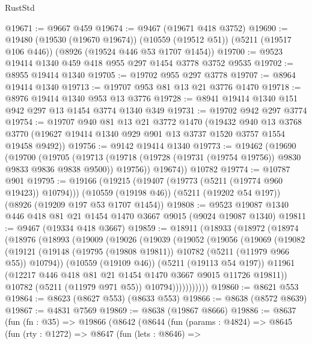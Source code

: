 \begin{lexlean}{RustStd}
\begin{coremodule}
@19671 := @9667 @459
@19674 := @9467 (@19671 @418 @3752)
@19690 := @19480
    (@19530 (@19670 @19674))
    (@10559 (@19512 @51))
    (@5211 (@19517 @106 @446))
    (@8926 (@19524 @446 @53 @1707 @1454))
@19700 := @9523 @19414 @1340 @459 @418 @955 @297 @1454 @3778 @3752 @9535
@19702 := @8955 @19414 @1340
@19705 := @19702 @955 @297 @3778
@19707 := @8964 @19414 @1340
@19713 := @19707 @953 @81 @13 @21 @3776 @1470
@19718 := @8976 @19414 @1340 @953 @13 @3776
@19728 := @8941 @19414 @1340 @151 @942 @297 @13 @1454 @3774 @1340 @349
@19731 := @19702 @942 @297 @3774
@19754 := @19707
    @940
    @81
    @13
    @21
    @3772
    @1470
    (@19432
      @940
      @13
      @3768
      @3770
      (@19627 @19414 @1340 @929 @901 @13 @3737 @1520 @3757 @1554 @19458 @9492))
@19756 := @9142 @19414 @1340
@19773 := @19462
    (@19690
      (@19700
        (@19705
          (@19713 (@19718 (@19728 (@19731 (@19754 @19756)) @9830 @9833 @9836 @9838 @9500)) @19756))
        @19674))
    @10782
@19774 := @10787 @901
@19795 := @19166
    (@19215 (@19407 (@19773 (@5211 (@19774 @960 @19423)) @10794)))
    (@10559 (@19198 @46))
    (@5211 (@19202 @54 @197))
    (@8926 (@19209 @197 @53 @1707 @1454))
@19808 := @9523 @19087 @1340 @446 @418 @81 @21 @1454 @1470 @3667 @9015 (@9024 @19087 @1340)
@19811 := @9467 (@19334 @418 @3667)
@19859 := @18911
    (@18933
      (@18972
        (@18974
          (@18976
            (@18993
              (@19009
                (@19026
                  (@19039
                    (@19052
                      (@19056
                        (@19069
                          (@19082
                            (@19121
                              (@19148
                                (@19795 (@19808 @19811))
                                @10782
                                (@5211 (@11979 @966 @55))
                                @10794))
                            (@10559 (@19109 @46))
                            (@5211 (@19113 @54 @197))
                            @11961
                            (@12217 @446 @418 @81 @21 @1454 @1470 @3667 @9015 @11726 @19811))
                          @10782
                          (@5211 (@11979 @971 @55))
                          @10794)))))))))))
@19860 := @8621 @553
@19864 := @8623 (@8627 @553) (@8633 @553)
@19866 := @8638 (@8572 @8639)
@19867 := @4831 @7569
@19869 := @8638 (@19867 @8666)
@19886 := @8637
    (fun (fn : @35) =>
    @19866
      (@8642
        (@8644
          (fun (params : @4824) =>
          @8645
            (fun (rty : @1272) =>
            @8647
              (fun (lets : @8646) =>

\end{coremodule}
\end{lexlean}
